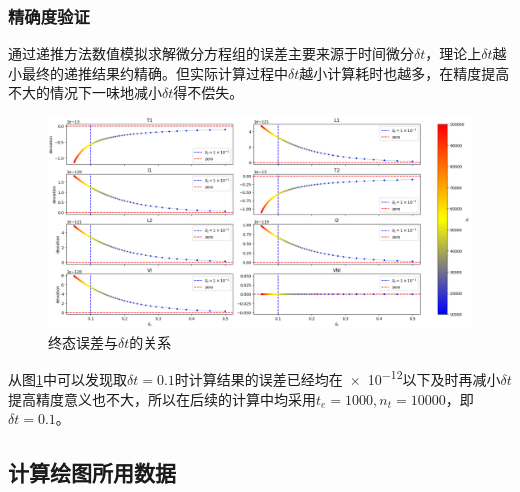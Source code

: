 \documentclass{ctexart}
\begin{document}
\subsubsection{精确度验证}
通过递推方法数值模拟求解微分方程组的误差主要来源于时间微分$\delta t$，理论上$\delta t$越小最终的递推结果约精确。但实际计算过程中$\delta t$越小计算耗时也越多，在精度提高不大的情况下一味地减小$\delta t$得不偿失。
\begin{figure}[H]
    \centering
    \includegraphics[width=\linewidth]{0.1.png}
    \caption{终态误差与$\delta t$的关系}
    \label{fig.0.1}
\end{figure}
从图\ref{fig.0.1}中可以发现取$\delta t=0.1$时计算结果的误差已经均在\num{e-12}以下及时再减小$\delta t$提高精度意义也不大，所以在后续的计算中均采用$t_{e}=1000,n_{t}=10000$，即$\delta t=0.1$。

\subsection{计算绘图所用数据}
\end{document}
